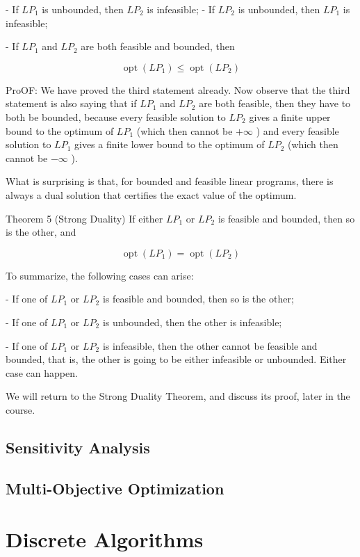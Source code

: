 \documentclass[letter,12pt]{book}
\renewcommand{\0}{\mathbf{0}}
\begin{document}
- If $L P_{1}$ is unbounded, then $L P_{2}$ is infeasible; - If $L P_{2}$ is unbounded, then $L P_{1}$ is infeasible;

- If $L P_{1}$ and $L P_{2}$ are both feasible and bounded, then

$$
\operatorname{opt}\left(L P_{1}\right) \leq \operatorname{opt}\left(L P_{2}\right)
$$

ProOF: We have proved the third statement already. Now observe that the third statement is also saying that if $L P_{1}$ and $L P_{2}$ are both feasible, then they have to both be bounded, because every feasible solution to $L P_{2}$ gives a finite upper bound to the optimum of $L P_{1}$ (which then cannot be $+\infty$ ) and every feasible solution to $L P_{1}$ gives a finite lower bound to the optimum of $L P_{2}$ (which then cannot be $-\infty$ ).

What is surprising is that, for bounded and feasible linear programs, there is always a dual solution that certifies the exact value of the optimum.

Theorem 5 (Strong Duality) If either $L P_{1}$ or $L P_{2}$ is feasible and bounded, then so is the other, and

$$
\operatorname{opt}\left(L P_{1}\right)=\operatorname{opt}\left(L P_{2}\right)
$$

To summarize, the following cases can arise:

- If one of $L P_{1}$ or $L P_{2}$ is feasible and bounded, then so is the other;

- If one of $L P_{1}$ or $L P_{2}$ is unbounded, then the other is infeasible;

- If one of $L P_{1}$ or $L P_{2}$ is infeasible, then the other cannot be feasible and bounded, that is, the other is going to be either infeasible or unbounded. Either case can happen.

We will return to the Strong Duality Theorem, and discuss its proof, later in the course.
\chapter{Sensitivity Analysis}

\chapter{Multi-Objective Optimization}



\part{Discrete Algorithms}
\end{document}
